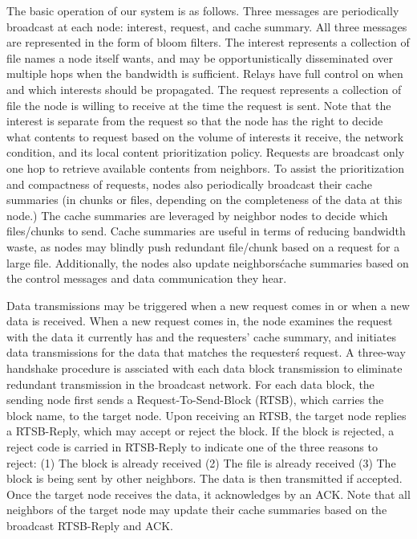 The basic operation of our system is as follows. Three messages are periodically broadcast at each node: interest, request, and cache summary. All three messages are represented in the form of bloom filters. The interest represents a collection of file names a node itself wants, and may be opportunistically disseminated over multiple hops when the bandwidth is sufficient. Relays have full control on when and which interests should be propagated. The request represents a collection of file the node is willing to receive at the time the request is sent. Note that the interest is separate from the request so that the node has the right to decide what contents to request based on the volume of interests it receive, the network condition, and its local content prioritization policy. Requests are broadcast only one hop to retrieve available contents from neighbors. To assist the prioritization and compactness of requests, nodes also periodically broadcast their cache summaries (in chunks or files, depending on the completeness of the data at this node.) The cache summaries are leveraged by neighbor nodes to decide which files/chunks to send. Cache summaries are useful in terms of reducing bandwidth waste, as nodes may blindly push redundant file/chunk based on a request for a large file.  Additionally, the nodes also update neighbors\' cache summaries based on the control messages and data communication they hear.

Data transmissions may be triggered when a new request comes in or when a new data is received. When a new request comes in, the node examines the request with the data it currently has and the requesters' cache summary, and initiates data transmissions for the data that matches the requester\'s request. A three-way handshake procedure is assciated with each data block transmission to eliminate redundant transmission in the broadcast network. For each data block, the sending node first sends a Request-To-Send-Block (RTSB), which carries the block name, to the target node. Upon receiving an RTSB, the target node replies a RTSB-Reply, which may accept or reject the block. If the block is rejected, a reject code is carried in RTSB-Reply to indicate one of the three reasons to reject: (1) The block is already received (2) The file is already received (3) The block is being sent by other neighbors. The data is then transmitted if accepted. Once the target node receives the data, it acknowledges by an ACK. Note that all neighbors of the target node may update their cache summaries based on the broadcast RTSB-Reply and ACK. 

